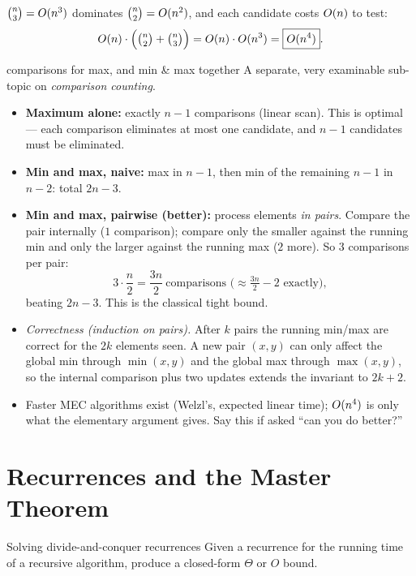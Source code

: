 \begin{cplx}
$\binom n3=O(n^3)$ dominates $\binom n2=O(n^2)$, and each candidate costs $O(n)$ to test:
\[
  O(n)\cdot\Big(\tbinom n2+\tbinom n3\Big)=O(n)\cdot O(n^3)=\boxed{O(n^4)} .
\]
\end{cplx}

\begin{facts}{comparisons for max, and min \& max together}
A separate, very examinable sub-topic on \emph{comparison counting}.
\begin{itemize}
  \item \textbf{Maximum alone:} exactly $n-1$ comparisons (linear scan). This is optimal ---
        each comparison eliminates at most one candidate, and $n-1$ candidates must be
        eliminated.
  \item \textbf{Min and max, naive:} max in $n-1$, then min of the remaining $n-1$ in $n-2$:
        total $2n-3$.
  \item \textbf{Min and max, pairwise (better):} process elements \emph{in pairs}. Compare the
        pair internally ($1$ comparison); compare only the smaller against the running min and
        only the larger against the running max ($2$ more). So $3$ comparisons per pair:
        \[
          3\cdot\frac n2=\frac{3n}{2}\ \text{comparisons (}\approx\tfrac{3n}{2}-2\text{ exactly)},
        \]
        beating $2n-3$. This is the classical tight bound.
  \item \emph{Correctness (induction on pairs).} After $k$ pairs the running min/max are correct
        for the $2k$ elements seen. A new pair $(x,y)$ can only affect the global min through
        $\min(x,y)$ and the global max through $\max(x,y)$, so the internal comparison plus two
        updates extends the invariant to $2k+2$.
  \item Faster MEC algorithms exist (Welzl's, expected linear time); $O(n^4)$ is only what
        the elementary argument gives. Say this if asked ``can you do better?''
\end{itemize}
\end{facts}

\section{Recurrences and the Master Theorem}

\begin{prob}{Solving divide-and-conquer recurrences}
Given a recurrence for the running time of a recursive algorithm, produce a closed-form
$\Theta$ or $O$ bound.
\end{prob}


